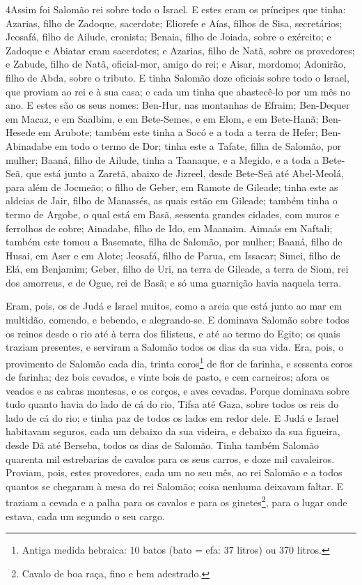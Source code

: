 \lettrine{4} Assim foi Salomão rei sobre todo o Israel. E
estes eram os príncipes que tinha: Azarias, filho de Zadoque,
sacerdote; Eliorefe e Aías, filhos de Sisa, secretários;
Jeosafá, filho de Ailude, cronista; Benaia, filho de Joiada,
sobre o exército; e Zadoque e Abiatar eram sacerdotes; e
Azarias, filho de Natã, sobre os provedores; e Zabude, filho de
Natã, oficial-mor, amigo do rei; e Aisar, mordomo; Adonirão,
filho de Abda, sobre o tributo. E tinha Salomão doze oficiais
sobre todo o Israel, que proviam ao rei e à sua casa; e cada um
tinha que abastecê-lo por um mês no ano. E estes são os seus
nomes: Ben-Hur, nas montanhas de Efraim; Ben-Dequer em Macaz, e
em Saalbim, e em Bete-Semes, e em Elom, e em Bete-Hanã;
Ben-Hesede em Arubote; também este tinha a Socó e a toda a
terra de Hefer; Ben-Abinadabe em todo o termo de Dor; tinha
este a Tafate, filha de Salomão, por mulher; Baaná, filho de
Ailude, tinha a Taanaque, e a Megido, e a toda a Bete-Seã, que está
junto a Zaretã, abaixo de Jizreel, desde Bete-Seã até Abel-Meolá,
para além de Jocmeão; o filho de Geber, em Ramote de Gileade;
tinha este as aldeias de Jair, filho de Manassés, as quais estão em
Gileade; também tinha o termo de Argobe, o qual está em Basã,
sessenta grandes cidades, com muros e ferrolhos de cobre;
Ainadabe, filho de Ido, em Maanaim. Aimaás em Naftali;
também este tomou a Basemate, filha de Salomão, por mulher;
Baaná, filho de Husai, em Aser e em Alote; Jeosafá,
filho de Parua, em Issacar; Simei, filho de Elá, em Benjamim;
Geber, filho de Uri, na terra de Gileade, a terra de Siom,
rei dos amorreus, e de Ogue, rei de Basã; e só uma guarnição havia
naquela terra.

Eram, pois, os de Judá e Israel muitos, como a areia que está
junto ao mar em multidão, comendo, e bebendo, e alegrando-se.
E dominava Salomão sobre todos os reinos desde o rio até à
terra dos filisteus, e até ao termo do Egito; os quais traziam
presentes, e serviram a Salomão todos os dias da sua vida.
Era, pois, o provimento de Salomão cada dia, trinta
coros\footnote{Antiga medida hebraica: 10 batos (bato = efa: 37
litros) ou 370 litros.} de flor de farinha, e sessenta coros de
farinha; dez bois cevados, e vinte bois de pasto, e cem
carneiros; afora os veados e as cabras montesas, e os corços, e aves
cevadas. Porque dominava sobre tudo quanto havia do lado de
cá do rio, Tifsa até Gaza, sobre todos os reis do lado de cá do rio;
e tinha paz de todos os lados em redor dele. E Judá e Israel
habitavam seguros, cada um debaixo da sua videira, e debaixo da sua
figueira, desde Dã até Berseba, todos os dias de Salomão.
Tinha também Salomão quarenta mil estrebarias de cavalos para
os seus carros, e doze mil cavaleiros. Proviam, pois, estes
provedores, cada um no seu mês, ao rei Salomão e a todos quantos se
chegaram à mesa do rei Salomão; coisa nenhuma deixavam faltar.
E traziam a cevada e a palha para os cavalos e para os
ginetes\footnote{Cavalo de boa raça, fino e bem adestrado.}, para o
lugar onde estava, cada um segundo o seu cargo.

